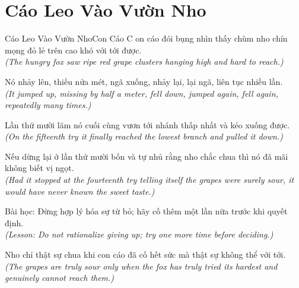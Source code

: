 \section{Cáo Leo Vào Vườn Nho}
\begin{truyen}{Cáo Leo Vào Vườn Nho}{Con Cáo}
C on cáo đói bụng nhìn thấy chùm nho chín mọng đỏ lẻ trên cao khó với tới được.\\
\textit{(The hungry fox saw ripe red grape clusters hanging high and hard to reach.)}

Nó nhảy lên, thiếu nửa mét, ngã xuống, nhảy lại, lại ngã, liên tục nhiều lần.\\
\textit{(It jumped up, missing by half a meter, fell down, jumped again, fell again, repeatedly many times.)}

Lần thứ mười lăm nó cuối cùng vươn tới nhánh thấp nhất và kéo xuống được.\\
\textit{(On the fifteenth try it finally reached the lowest branch and pulled it down.)}

Nếu dừng lại ở lần thứ mười bốn và tự nhủ rằng nho chắc chua thì nó đã mãi không biết vị ngọt.\\
\textit{(Had it stopped at the fourteenth try telling itself the grapes were surely sour, it would have never known the sweet taste.)}

Bài học: Đừng hợp lý hóa sự từ bỏ; hãy cố thêm một lần nữa trước khi quyết định.\\
\textit{(Lesson: Do not rationalize giving up; try one more time before deciding.)}

\end{truyen}
\begin{baihoc}
  Nho chỉ thật sự chua khi con cáo đã cố hết sức mà thật sự không thể với tới.\\
  \textit{(The grapes are truly sour only when the fox has truly tried its hardest and genuinely cannot reach them.)}
\end{baihoc}

